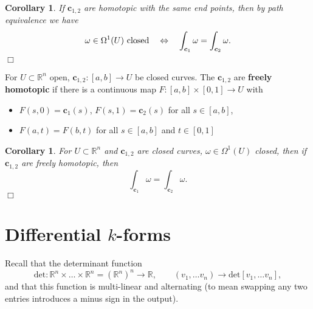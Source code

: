 \documentclass[letter-paper]{tufte-book}
\newtheorem{corollary}[theorem]{\color{pastel-blue}Corollary}
\newcommand{\qedwhite}{\hfill \ensuremath{\Box}}
\begin{document}
\begin{corollary}
  If $\boldsymbol{c}_{1,2}$ are homotopic with the same end points, then by path equivalence we have
  \begin{equation}
    \omega \in \Omega^1(U)\textnormal{ closed}\quad \Leftrightarrow \quad \int_{\boldsymbol{c}_1} \omega = \int_{\boldsymbol{c}_2} \omega.
  \end{equation}
  \qedwhite
\end{corollary}

For $U \subset \mathbb{R}^n$ open, $\boldsymbol{c}_{1,2} : [a, b] \to U$ be closed curves. The $\boldsymbol{c}_{1,2}$ are \textbf{freely homotopic} if there is a continuous map $F: [a, b] \times [0, 1] \to U$ with
\begin{itemize}
  \item $F(s, 0) = \boldsymbol{c}_1(s)$, $F(s, 1) = \boldsymbol{c}_2(s)$ for all $s \in [a,b]$,
  \item $F(a, t) = F(b,t)$ for all $s \in [a,b]$ and $t \in [0, 1]$
\end{itemize}

\begin{corollary}
  For $U\subset \mathbb{R}^n$ and $\boldsymbol{c}_{1,2}$ are closed curves, $\omega \in \Omega^1(U)$ closed, then if $\boldsymbol{c}_{1,2}$ are freely homotopic, then
  \begin{equation*}
    \int_{\boldsymbol{c}_1} \omega = \int_{\boldsymbol{c}_2} \omega.
  \end{equation*}
  \qedwhite
\end{corollary}


\section{Differential $k$-forms}


Recall that the determinant function
\begin{equation}
  \mbox{det} : \mathbb{R}^n \times \ldots \times \mathbb{R}^n = (\mathbb{R}^n)^n \to \mathbb{R}, \qquad (v_1, \ldots v_n) \to \mbox{det}[v_1, \ldots v_n],
\end{equation}
and that this function is multi-linear and alternating (to mean swapping any two entries introduces a minus sign in the output). 
\end{document}
